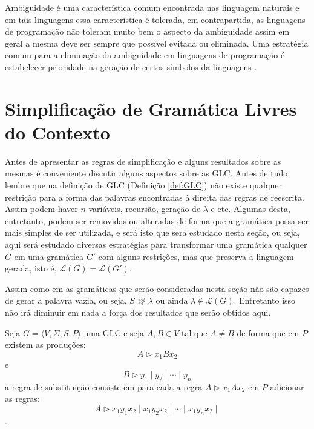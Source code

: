 Ambiguidade é uma característica comum encontrada nas linguagem naturais \cite{benjaLivro2010} e em tais linguagens essa característica é tolerada, em contrapartida, as linguagens de programação não toleram muito bem o aspecto da ambiguidade assim em geral a mesma deve ser sempre que possível evitada ou eliminada. Uma estratégia comum para a eliminação da ambiguidade em linguagens de programação é estabelecer prioridade na geração de certos símbolos da linguagens \cite{benjaLivro2010, aho2007}. 

\section{Simplificação de Gramática Livres do Contexto}\label{sec:SimplficacaoGLC}

Antes de apresentar as regras de simplificação e alguns resultados sobre as mesmas é conveniente discutir alguns aspectos sobre as GLC. Antes de tudo lembre que na definição de GLC (Definição \ref{def:GLC}) não existe qualquer restrição para a forma das palavras encontradas à direita das regras de reescrita. Assim podem haver $n$ variáveis, recursão, geração de $\lambda$ e etc. Algumas desta, entretanto, podem ser removidas ou alteradas de forma que a gramática possa ser mais simples de ser utilizada, e será isto que será estudado nesta seção, ou seja, aqui será estudado diversas estratégias para transformar uma gramática qualquer $G$ em uma gramática $G'$ com alguns restrições, mas que preserva a linguagem gerada, isto é, $\mathcal{L}(G) = \mathcal{L}(G')$. 

\begin{remark}
    Assim como em \cite{benjaLivro2010} as gramáticas que serão consideradas nesta seção não são capazes de gerar a palavra vazia, ou seja, $S \not\gg \lambda$ ou ainda $\lambda \notin \mathcal{L}(G)$. Entretanto isso não irá diminuir em nada a força dos resultados que serão obtidos aqui.
\end{remark}

\begin{definition}\label{def:RegraSubstituicao}
    Seja $G = \langle V, \Sigma, S, P\rangle$ uma GLC e seja $A, B \in V$ tal que $A \neq B$ de forma que em $P$ existem as produções:
    $$A \rhd x_1Bx_2$$
    e
    $$B \rhd y_1 \mid y_2 \mid \cdots \mid y_n$$
    a regra de substituição consiste em para cada a regra $A \rhd x_1A x_2$ em $P$ adicionar as regras:
    $$A \rhd x_1y_1x_2 \mid x_1y_2x_2 \mid \cdots \mid x_1y_nx_2 \mid$$.
\end{definition}

